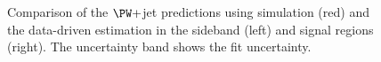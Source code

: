 \begin{figure}[h!] 
	 \centering 
	 \caption{Comparison of the $\PW+$jet predictions using simulation (red) and the data-driven estimation in the sideband (left) and signal regions (right). The uncertainty band shows the fit uncertainty.}
	 \label{fig:signal}
\end{figure}


